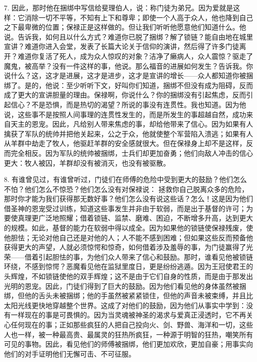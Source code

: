 7. 因此，那时他在捆绑中写信给斐理伯人，说：称门徒为弟兄。因为爱就是这样：它消除一切不平等，不知有上下和尊卑；即使一个人高于众人，他也降到自己之下最卑微的位置；保禄正是这样做的。但让我们听听他愿意他们知道什么。他说。告诉我，如何且以什么方式？难道你已脱了捆绑？解了锁链？能自由地在城里宣讲？难道你进入会堂，发表了长篇大论关于信仰的演讲，然后得了许多门徒离开？难道你复活了死人，成为众人惊叹的对象？洁净了癞病人，众人震惊？驱走了魔鬼，被高举？没有一件这样的事，他说。那么福音的进展如何发生？告诉我。你说什么？这，这才是进展，这才是进步，这才是宣讲的增长——众人都知道你被捆绑了。是的，他说：至少听听下文，好叫你们知道，捆绑不但没有成为阻碍，反而成了更大的宣讲胆量的理由。保禄啊，你说什么？你的捆绑没有引起焦虑，反而引起信心？不是恐惧，而是热切的渴望？所说的事没有连贯性。我也知道。因为他说，这些事不是按照人间事理的连贯性发生的，而是所发生的事超越自然，成功来自天主的恩宠。因此，凡给别人带来焦虑的事，却给他带来了信心。因为如果有人擒获了军队的统帅并把他关起来，公之于众，他就使整个军营陷入溃逃；如果有人从羊群中劫走了牧人，他驱赶羊群的安全感就很大。但在保禄身上却不是这样，反而完全相反。因为军队的统帅被捆绑，士兵们却更加奋勇；他们向敌人冲击的信心更大：牧人被囚，羊群却没有被消灭，也没有被驱散。\par

8. 有谁曾见过，有谁曾听过，门徒们在师傅的危险中受到更大的鼓励？他们怎么不怕？他们怎么不惊恐？他们怎么没有对保禄说： 拯救你自己脱离众多的危险，那时你才能为我们获得那无数好事？他们怎么没有说这些话？怎么！这是因为他们借圣神的恩宠受过训练，知道这些事发生并非由于软弱，而是出于基督的许可；为要使真理更广泛地照耀；借着锁链、监禁、磨难、困迫，不断增多升高，达到更大的规模。如此，基督的能力在软弱中得以成全。因为如果他的锁链使保禄残废，使他胆怯；无论对他自己还是对他的人；人不能不感到困难；但如果这些反而预备他获得更大的声望，人就必须惊愕和惊奇，如何借着涉及羞辱的事，为门徒赢得了光荣——借着引起胆怯的事，为他们众人带来了信心和鼓励。那时，谁看见他被锁链环绕，不感到惊愕？恶魔看见他在监狱里度日，更是纷纷逃遁。因为王冠使君王的头辉煌，不如锁链使他的双手辉煌；这不是由于它们自身的性质，而是由于那发出光明的恩宠。因此，门徒们得到了巨大的鼓励。因为他们看见他的身体虽然被捆绑，但他的舌头未被捆绑；他的手虽然被紧紧锁住，但他的声音未被束缚，并且比太阳光线更快地穿越整个世界。这成了对他们的鼓励，因为他们从事实中学到：没有一样现在的事是可畏惧的。因为当灵魂被神圣的渴求与爱真正浸透时，它不再关心任何现在的事；正如那些疯狂的人把自己投向火、剑、野兽、海洋和一切，这些人也一样，被一种最高贵、最属灵的狂热所疯狂，一种源于明智的狂热，嘲笑所有可见的事物。因此，看见他们的师傅被捆绑，他们更加欢欣，更加自豪；用事实向他们的对手证明他们无懈可击、不可征服。\par

